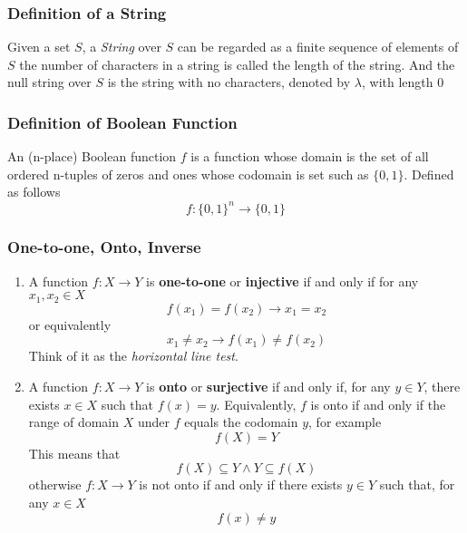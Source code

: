 \documentclass[12pt]{book}
\newcommand{\then}{\rightarrow}
\begin{document}
\subsubsection{Definition of a String}
Given a set $S$, a \textit{String} over $S$ can be regarded as a finite sequence of elements of $S$ the number of characters in a string is called the length of the string. And the null string over $S$ is the string with no characters, denoted by $\lambda$, with length $0$

\subsubsection{Definition of Boolean Function}
An (n-place) Boolean function $f$ is a function whose domain is the set of all ordered n-tuples of zeros and ones whose codomain is set such as $\{0,1\}$. Defined as follows
\[
f \colon \{0,1\}^n \to \{0,1\}
\]

\subsubsection{One-to-one, Onto, Inverse}
\begin{enumerate}
    \item A function $f \colon X \to Y$ is \textbf{one-to-one} or \textbf{injective} if and only if for any $x_1,x_2 \in X$
        \[
        f(x_1) = f(x_2) \then x_1=x_2
        \]
        or equivalently
        \[
        x_1 \neq x_2 \then f(x_1) \neq f(x_2)
        \]
        Think of it as the \textit{horizontal line test}.
    \item A function $f \colon X \to Y$ is \textbf{onto} or \textbf{surjective} if and only if, for any $y\in Y$, there exists $x \in X$ such that $f(x) = y$. Equivalently, $f$ is onto if and only if the range of domain $X$ under $f$ equals the codomain $y$, for example
        \[
        f(X) = Y
        \]
        This means that
        \[
        f(X) \subseteq Y \wedge Y \subseteq f(X)
        \]
        otherwise $f \colon X \to Y$ is not onto if and only if there exists $y\in Y$ such that, for any $x \in X$ 
        \[
        f(x) \neq y
        \]
        
\end{enumerate}
\end{document}
